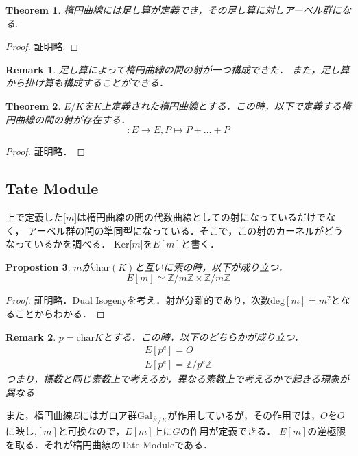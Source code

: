 \documentclass{ujarticle}
\newtheorem{thm}{Theorem}[section]
\newtheorem{prop}[thm]{Propostion}
\newtheorem*{rem}{Remark}
\begin{document}
\begin{thm}
  楕円曲線には足し算が定義でき，その足し算に対しアーベル群になる.
\end{thm}
\begin{proof}
 証明略.
\end{proof}

\begin{rem}
 足し算によって楕円曲線の間の射が一つ構成できた．
 また，足し算から掛け算も構成することができる．
\end{rem}

\begin{thm}
 $E/K$を$K$上定義された楕円曲線とする．この時，以下で定義する楕円曲線の間の射が存在する．
 \begin{equation}
   [m]:E \to E, P \mapsto P + \dots +P
 \end{equation}
\end{thm}
\begin{proof}
 証明略．
\end{proof}

\subsection{Tate Module}
\label{sub:Tate Module}
上で定義した[$m$]は楕円曲線の間の代数曲線としての射になっているだけでなく，
アーベル群の間の準同型になっている．そこで，この射のカーネルがどうなっているかを調べる．
Ker[$m$]を$E[m]$と書く．
\begin{prop}
  $m$が$\mathrm{char}(K)$と互いに素の時，以下が成り立つ．
  \begin{equation*}
   E[m] \simeq \mathbb{Z}/m \mathbb{Z} \times \mathbb{Z}/m \mathbb{Z}
  \end{equation*}
\end{prop}

\begin{proof}
 証明略．Dual Isogenyを考え．射が分離的であり，次数$\mathrm{deg}[m]=m^2$となることからわかる．
\end{proof}

\begin{rem}
  $p =\mathrm{char}K$とする．この時，以下のどちらかが成り立つ．
  \begin{eqnarray*}
  E[p^e]={O} \\
  E[p^e]=\mathbb{Z}/p^e \mathbb{Z}
  \end{eqnarray*}
つまり，標数と同じ素数上で考えるか，異なる素数上で考えるかで起きる現象が異なる.
\end{rem}

また，楕円曲線$E$にはガロア群$\mathrm{Gal}_{\overline{K}/K}$が作用しているが，その作用では，$O$を$O$に映し,$[m]$と可換なので，$E[m]$上に$G$の作用が定義できる．
$E[m]$の逆極限を取る．それが楕円曲線のTate-Moduleである．
\end{document}
